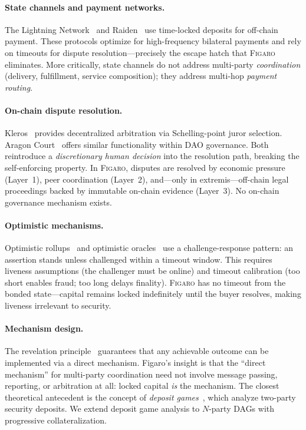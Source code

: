 \documentclass[11pt,a4paper]{article}
\theoremstyle{definition}
\theoremstyle{remark}
\newcommand{\figaro}{\textsc{Figaro}}
\begin{document}
\paragraph{State channels and payment networks.}
The Lightning Network~\citep{poon2016} and Raiden~\citep{raiden2017} use
time-locked deposits for off-chain payment. These protocols optimize for
high-frequency bilateral payments and rely on timeouts for dispute
resolution---precisely the escape hatch that \figaro{} eliminates. More
critically, state channels do not address multi-party \emph{coordination}
(delivery, fulfillment, service composition); they address multi-hop
\emph{payment routing}.

\paragraph{On-chain dispute resolution.}
Kleros~\citep{kleros2019} provides decentralized arbitration via
Schelling-point juror selection. Aragon Court~\citep{aragon2017} offers
similar functionality within DAO governance. Both reintroduce a
\emph{discretionary human decision} into the resolution path, breaking
the self-enforcing property. In \figaro{}, disputes are resolved by
economic pressure (Layer~1), peer coordination (Layer~2), and---only in
extremis---off-chain legal proceedings backed by immutable on-chain
evidence (Layer~3). No on-chain governance mechanism exists.

\paragraph{Optimistic mechanisms.}
Optimistic rollups~\citep{optimism2021} and optimistic
oracles~\citep{uma2020} use a challenge-response pattern: an assertion
stands unless challenged within a timeout window. This requires
liveness assumptions (the challenger must be online) and
timeout calibration (too short enables fraud; too long delays
finality). \figaro{} has no timeout from the bonded state---capital
remains locked indefinitely until the buyer resolves, making liveness
irrelevant to security.

\paragraph{Mechanism design.}
The revelation principle~\citep{myerson1981} guarantees that any
achievable outcome can be implemented via a direct mechanism. Figaro's
insight is that the ``direct mechanism'' for multi-party coordination
need not involve message passing, reporting, or arbitration at all:
locked capital \emph{is} the mechanism. The closest theoretical
antecedent is the concept of \emph{deposit
games}~\citep{asgaonkar2019}, which analyze two-party security deposits.
We extend deposit game analysis to $N$-party DAGs with progressive
collateralization.
\end{document}

